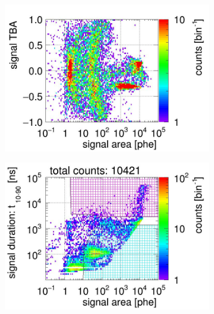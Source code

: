 \begin{landscape}
\begin{figure}[!p]
\begin{subfigure}[t]{0.32\textwidth}
			\includegraphics[width=\figurewidth,clip,trim={0 8 0 40}]{Figures/GasTest/CutsValid/res64850/tbapaX23Vecfig64850.jpg}
			\caption{}
			\label{fig:signal selection dv -12 02}
		\end{subfigure}
		\begin{subfigure}[t]{0.32\textwidth}
			\centering
			\includegraphics[width=\figurewidth,clip,trim={0 98 0 15}]{Figures/GasTest/CutsValid/res64850/pdpa26Vecfig64850.jpg}

\end{subfigure}
\end{figure}
\end{landscape}
